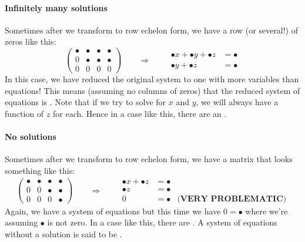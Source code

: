 \documentclass{ximera}
\begin{document}
\paragraph{Infinitely many solutions}

Sometimes after we transform to row echelon form, we have a row (or
several!) of zeros like this:
\[
  \left(
    \begin{array}{ccc|c}
      \bullet &   \bullet & \bullet & \bullet  \\
      0 &   \bullet & \bullet & \bullet \\
      0& 0  & 0 & 0
    \end{array}
  \right)
  \qquad\Longrightarrow\qquad
  \begin{aligned}
    \bullet x +  \bullet y + \bullet z &= \bullet \\
    \bullet y + \bullet z&= \bullet
  \end{aligned}
\]
In this case, we have reduced the original system to one with more
variables than equations!  This means (assuming no columns of zeros)
that the reduced system of equations is . Note
that if we try to solve for $x$ and $y$, we will always have a
function of $z$ for each. Hence in a case like this, there are an
.

\paragraph{No solutions}

Sometimes after we transform to row echelon form, we have a matrix
that looks something like this:
\[
  \left(
    \begin{array}{ccc|c}
      \bullet &   \bullet & \bullet & \bullet  \\
      0 &   0 & \bullet & \bullet \\
      0& 0  &  0 & \bullet
    \end{array}
  \right)
  \qquad\Longrightarrow\qquad
  \begin{aligned}
    \bullet x  + \bullet z &= \bullet & \\
    \bullet z&= \bullet & \\
    0 &=\bullet & \textbf{(VERY PROBLEMATIC)}
  \end{aligned}
\]
Again, we have a system of equations but this time we have
$0 = \bullet$ where we're assuming $\bullet$ is not zero. In a case like this,
there are . A system of equations without a solution
is said to be .
\end{document}
